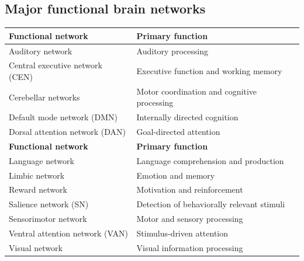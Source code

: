 \subsection{Major functional brain networks}
\begin{longtable}{@{}p{}p{}@{}}
\toprule
\textbf{Functional network} & \textbf{Primary function} \\
\midrule
\endfirsthead
\toprule
Auditory network & Auditory processing \\
\midrule
\endhead
Central executive network (CEN) & Executive function and working memory \\
Cerebellar networks & Motor coordination and cognitive processing \\
Default mode network (DMN) & Internally directed cognition \\
Dorsal attention network (DAN) & Goal-directed attention \\
\textbf{Functional network} & \textbf{Primary function} \\
Language network & Language comprehension and production \\
Limbic network & Emotion and memory \\
Reward network & Motivation and reinforcement \\
Salience network (SN) & Detection of behaviorally relevant stimuli \\
Sensorimotor network & Motor and sensory processing \\
Ventral attention network (VAN) & Stimulus-driven attention \\
Visual network & Visual information processing \\
\bottomrule
\end{longtable}

